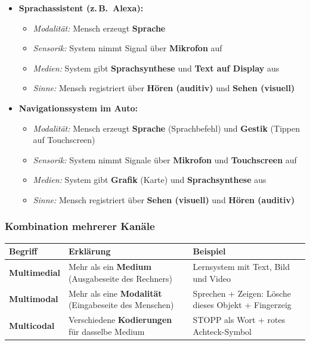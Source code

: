 \documentclass[12pt, a4paper]{article}
\begin{document}
\begin{itemize}
  \item \textbf{Sprachassistent (z.\,B.\ Alexa):}
    \begin{itemize}
      \item \textit{Modalität:} Mensch erzeugt \textbf{Sprache}
      \item \textit{Sensorik:} System nimmt Signal über \textbf{Mikrofon} auf
      \item \textit{Medien:} System gibt \textbf{Sprachsynthese} und \textbf{Text auf Display} aus
      \item \textit{Sinne:} Mensch registriert über \textbf{Hören (auditiv)} und \textbf{Sehen (visuell)}
    \end{itemize}

  \item \textbf{Navigationssystem im Auto:}
    \begin{itemize}
      \item \textit{Modalität:} Mensch erzeugt \textbf{Sprache} (Sprachbefehl) und \textbf{Gestik} (Tippen auf Touchscreen)
      \item \textit{Sensorik:} System nimmt Signale über \textbf{Mikrofon} und \textbf{Touchscreen} auf
      \item \textit{Medien:} System gibt \textbf{Grafik} (Karte) und \textbf{Sprachsynthese} aus
      \item \textit{Sinne:} Mensch registriert über \textbf{Sehen (visuell)} und \textbf{Hören (auditiv)}
    \end{itemize}
\end{itemize}

\subsubsection{Kombination mehrerer Kanäle}

\begin{center}
\begin{tabular}{p{2.8cm} p{5.5cm} p{5cm}}
\hline
\textbf{Begriff} & \textbf{Erklärung} & \textbf{Beispiel} \\
\hline
\textbf{Multimedial} & Mehr als ein \textbf{Medium} (Ausgabeseite des Rechners) &
  Lernsystem mit Text, Bild und Video \\[4pt]
\textbf{Multimodal} & Mehr als eine \textbf{Modalität} (Eingabeseite des Menschen) &
  Sprechen + Zeigen: \glqq{}Lösche dieses Objekt\grqq{} + Fingerzeig \\[4pt]
\textbf{Multicodal} & Verschiedene \textbf{Kodierungen} für dasselbe Medium &
  \glqq{}STOPP\grqq{} als Wort + rotes Achteck-Symbol \\
\hline
\end{tabular}
\end{center}
\end{document}

